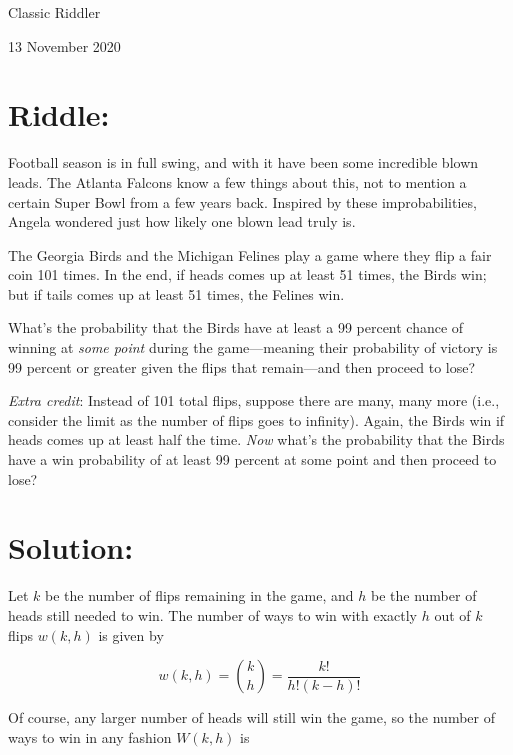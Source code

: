 \documentclass{article}
\begin{document}
\pagestyle{empty} %

\begin{center}
{\LARGE Classic Riddler}

\vspace{0.15in}

{\Large 13 November 2020}
\end{center}


\section*{Riddle:}

Football season is in full swing, and with it have been some incredible blown leads.
The Atlanta Falcons know a few things about this, not to mention a certain Super Bowl from a few years back. Inspired by these improbabilities, Angela wondered just how likely one blown lead truly is.

The Georgia Birds and the Michigan Felines play a game where they flip a fair coin 101 times.
In the end, if heads comes up at least 51 times, the Birds win; but if tails comes up at least 51 times, the Felines win.

What's the probability that the Birds have at least a 99 percent chance of winning at \textit{some point} during the game---meaning their probability of victory is 99 percent or greater given the flips that remain---and then proceed to lose?

\textit{Extra credit}: Instead of 101 total flips, suppose there are many, many more (i.e., consider the limit as the number of flips goes to infinity).
Again, the Birds win if heads comes up at least half the time.
\textit{Now} what's the probability that the Birds have a win probability of at least 99 percent at some point and then proceed to lose?


\section*{Solution:}

Let $k$ be the number of flips remaining in the game, and $h$ be the number of heads still needed to win.
The number of ways to win with exactly $h$ out of $k$ flips $w(k,h)$ is given by

\[
w(k,h)=\binom{k}{h}=\frac{k!}{h!(k-h)!}
\]

Of course, any larger number of heads will still win the game, so the number of ways to win in any fashion $W(k,h)$ is
\end{document}
